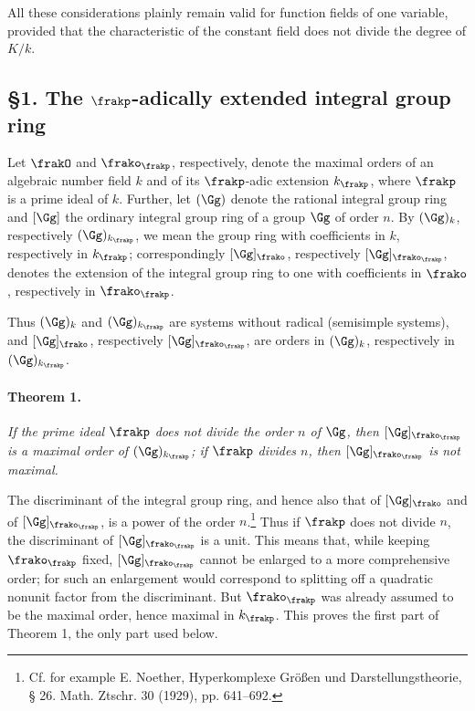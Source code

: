 All these considerations plainly remain valid for function fields of one variable, provided that the characteristic of the constant field does not divide the degree of \(K/k\).

\subsection*{§1. The \(\frakp\)-adically extended integral group ring}

Let \(\frakO\) and \(\frako_\frakp\), respectively, denote the maximal orders of an algebraic number field \(k\) and of its \(\frakp\)-adic extension \(k_\frakp\), where \(\frakp\) is a prime ideal of \(k\). Further, let \((\Gg)\) denote the rational integral group ring and \([\Gg]\) the ordinary integral group ring of a group \(\Gg\) of order \(n\). By \((\Gg)_k\), respectively \((\Gg)_{k_\frakp}\), we mean the group ring with coefficients in \(k\), respectively in \(k_\frakp\); correspondingly \([\Gg]_\frako\), respectively \([\Gg]_{\frako_\frakp}\), denotes the extension of the integral group ring to one with coefficients in \(\frako\), respectively in \(\frako_\frakp\).

Thus \((\Gg)_k\) and \((\Gg)_{k_\frakp}\) are systems without radical (semisimple systems), and \([\Gg]_\frako\), respectively \([\Gg]_{\frako_\frakp}\), are orders in \((\Gg)_k\), respectively in \((\Gg)_{k_\frakp}\).

\paragraph{Theorem 1.}
\emph{If the prime ideal \(\frakp\) does not divide the order \(n\) of \(\Gg\), then \([\Gg]_{\frako_\frakp}\) is a maximal order of \((\Gg)_{k_\frakp}\); if \(\frakp\) divides \(n\), then \([\Gg]_{\frako_\frakp}\) is not maximal.}

The discriminant of the integral group ring, and hence also that of \([\Gg]_\frako\) and of \([\Gg]_{\frako_\frakp}\), is a power of the order \(n\).\footnote{Cf. for example E. Noether, Hyperkomplexe Größen und Darstellungstheorie, § 26. Math. Ztschr. 30 (1929), pp. 641--692.} Thus if \(\frakp\) does not divide \(n\), the discriminant of \([\Gg]_{\frako_\frakp}\) is a unit. This means that, while keeping \(\frako_\frakp\) fixed, \([\Gg]_{\frako_\frakp}\) cannot be enlarged to a more comprehensive order; for such an enlargement would correspond to splitting off a quadratic nonunit factor from the discriminant. But \(\frako_\frakp\) was already assumed to be the maximal order, hence maximal in \(k_\frakp\). This proves the first part of Theorem 1, the only part used below.

